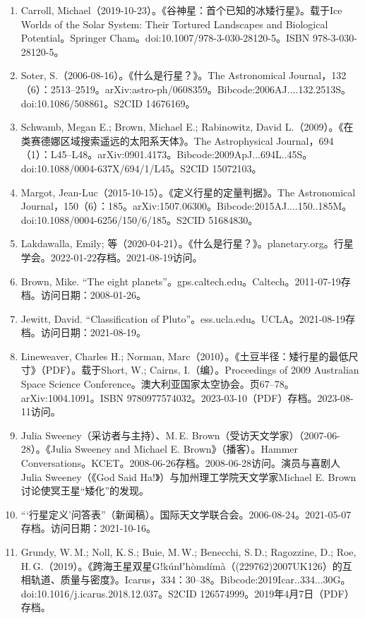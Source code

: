 \begin{enumerate}
\item Carroll, Michael（2019-10-23）。《谷神星：首个已知的冰矮行星》。载于Ice Worlds of the Solar System: Their Tortured Landscapes and Biological Potential。Springer Cham。doi:10.1007/978-3-030-28120-5。ISBN 978-3-030-28120-5。
\item Soter, S.（2006-08-16）。《什么是行星？》。The Astronomical Journal，132（6）：2513–2519。arXiv:astro-ph/0608359。Bibcode:2006AJ....132.2513S。doi:10.1086/508861。S2CID 14676169。
\item Schwamb, Megan E.; Brown, Michael E.; Rabinowitz, David L.（2009）。《在类赛德娜区域搜索遥远的太阳系天体》。The Astrophysical Journal，694（1）：L45–L48。arXiv:0901.4173。Bibcode:2009ApJ...694L..45S。doi:10.1088/0004-637X/694/1/L45。S2CID 15072103。
\item Margot, Jean-Luc（2015-10-15）。《定义行星的定量判据》。The Astronomical Journal，150（6）：185。arXiv:1507.06300。Bibcode:2015AJ....150..185M。doi:10.1088/0004-6256/150/6/185。S2CID 51684830。
\item Lakdawalla, Emily; 等（2020-04-21）。《什么是行星？》。planetary.org。行星学会。2022-01-22存档。2021-08-19访问。
\item Brown, Mike. “The eight planets”。gps.caltech.edu。Caltech。2011-07-19存档。访问日期：2008-01-26。
\item Jewitt, David. “Classification of Pluto”。ess.ucla.edu。UCLA。2021-08-19存档。访问日期：2021-08-19。
\item Lineweaver, Charles H.; Norman, Marc（2010）。《土豆半径：矮行星的最低尺寸》（PDF）。载于Short, W.; Cairns, I.（编）。Proceedings of 2009 Australian Space Science Conference。澳大利亚国家太空协会。页67–78。arXiv:1004.1091。ISBN 9780977574032。2023-03-10（PDF）存档。2023-08-11访问。
\item Julia Sweeney（采访者与主持）、M.\,E. Brown（受访天文学家）（2007-06-28）。《Julia Sweeney and Michael E. Brown》（播客）。Hammer Conversations。KCET。2008-06-26存档。2008-06-28访问。演员与喜剧人Julia Sweeney（《God Said Ha!》）与加州理工学院天文学家Michael E. Brown讨论使冥王星“矮化”的发现。
\item “‘行星定义’问答表”（新闻稿）。国际天文学联合会。2006-08-24。2021-05-07存档。访问日期：2021-10-16。
\item Grundy, W.\,M.; Noll, K.\,S.; Buie, M.\,W.; Benecchi, S.\,D.; Ragozzine, D.; Roe, H.\,G.（2019）。《跨海王星双星Gǃkúnǁʼhòmdímà（(229762)2007UK126）的互相轨道、质量与密度》。Icarus，334：30–38。Bibcode:2019Icar..334...30G。doi:10.1016/j.icarus.2018.12.037。S2CID 126574999。2019年4月7日（PDF）存档。

\end{enumerate}
